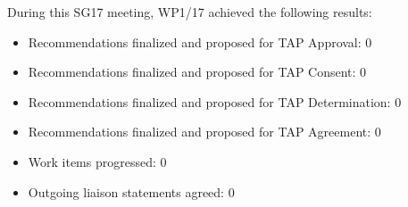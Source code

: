 During this SG17 meeting, WP1/17 achieved the following results:

\begin{itemize}
  \item Recommendations finalized and proposed for TAP Approval: 0
  \item Recommendations finalized and proposed for TAP Consent: 0
  \item Recommendations finalized and proposed for TAP Determination: 0
  \item Recommendations finalized and proposed for TAP Agreement: 0
  \item Work items progressed: 0
  \item Outgoing liaison statements agreed: 0
\end{itemize}